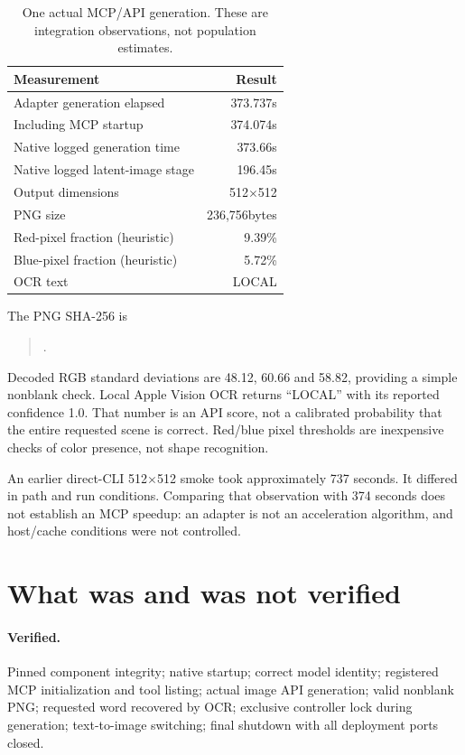 \documentclass[11pt]{article}
\begin{document}
\begin{table}[H]\centering
\begin{tabular}{lr}\toprule
Measurement & Result\\\midrule
Adapter generation elapsed &373.737s\\
Including MCP startup &374.074s\\
Native logged generation time &373.66s\\
Native logged latent-image stage &196.45s\\
Output dimensions &512$\times$512\\
PNG size &236,756bytes\\
Red-pixel fraction (heuristic) &9.39\%\\
Blue-pixel fraction (heuristic) &5.72\%\\
OCR text &LOCAL\\\bottomrule
\end{tabular}
\caption{One actual MCP/API generation. These are integration observations, not population estimates.}
\end{table}

The PNG SHA-256 is
\begin{quote}\small\ttfamily
{}.
\end{quote}
Decoded RGB standard deviations are 48.12, 60.66 and 58.82, providing a simple nonblank check. Local Apple Vision OCR returns ``LOCAL'' with its reported confidence 1.0. That number is an API score, not a calibrated probability that the entire requested scene is correct. Red/blue pixel thresholds are inexpensive checks of color presence, not shape recognition.

An earlier direct-CLI 512$\times$512 smoke took approximately 737 seconds. It differed in path and run conditions. Comparing that observation with 374 seconds does not establish an MCP speedup: an adapter is not an acceleration algorithm, and host/cache conditions were not controlled.

\section{What was and was not verified}
\paragraph{Verified.} Pinned component integrity; native startup; correct model identity; registered MCP initialization and tool listing; actual image API generation; valid nonblank PNG; requested word recovered by OCR; exclusive controller lock during generation; text-to-image switching; final shutdown with all deployment ports closed.
\end{document}
